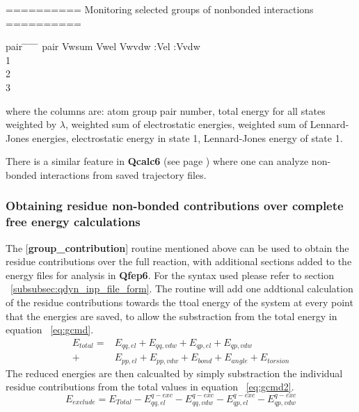 \documentclass[a4paper,11pt]{article}
\let\origref\ref
\def\ref#1{\unskip~\origref{#1}}
\begin{document}
========== Monitoring selected groups of nonbonded interactions ==========
\begin{tabbing}
  pair \= \hspace{40pt}  \= \hspace{40pt}  \= \hspace{40pt}  \= \hspace{40pt}  \= \hspace{40pt} \kill
  pair \> Vwsum  \> Vwel    \> Vwvdw  :Vel   :Vvdw \\
  1             \\
  2                 \\
  3                 \\
\end{tabbing}

where the columns are: atom group pair number, total energy for
all states weighted by $\lambda $, weighted sum of electrostatic
energies, weighted sum of Lennard-Jones energies, electrostatic
energy in state 1, Lennard-Jones energy of state 1.

There is a similar feature in \textbf{Qcalc6} (see page
\pageref{subsubsec:qcalc}) where one can analyze non-bonded
interactions from saved trajectory files.

\subsubsection{Obtaining residue non-bonded contributions over complete free energy calculations}
\label{subsubsec:groupexc}
The [\textbf{group{\_}contribution}] routine mentioned above 
can be used to obtain the residue 
contributions over the full reaction, with additional
sections added to the energy files for analysis in \textbf{Qfep6}.
For the syntax used please refer to section \ref{subsubsec:qdyn_inp_file_form}.
The routine will add one addtional calculation of the residue contributions towards the
ttoal energy of the system at every point that the energies are saved, to allow
the substraction from the total energy in equation \ref{eq:gcmd}.
\begin{equation} \label{eq:gcmd}
\begin{aligned}
E_{total}       =& E_{qq,el} + E_{qq,vdw} + E_{qp,el} + E_{qp,vdw} \\
+& E_{pp,el} + E_{pp,vdw} + E_{bond} + E_{angle} + E_{torsion}
\end{aligned}
\end{equation}
The reduced energies are then calcualted by simply substraction the individual residue 
contributions from the total values in equation \ref{eq:gcmd2}.
\begin{equation} \label{eq:gcmd2}
E_{exclude} = E_{Total} - E_{qq,el}^{q-exc} - E_{qq,vdw}^{q-exc} - E_{qp,el}^{q-exc} - E_{qp,vdw}^{q-exc}
\end{equation}
\end{document}
